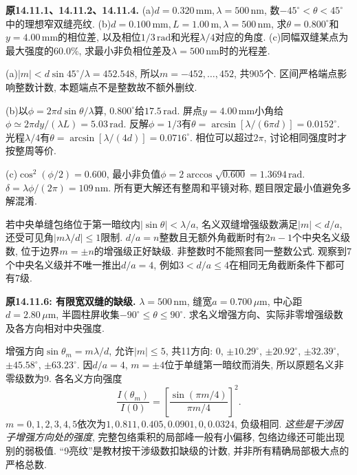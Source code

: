 \label{tb:interference-examples}
\begin{example}
\textbf{原14.11.1、14.11.2、14.11.4.} (a)$d=0.320\,\mathrm{mm},\lambda=500\,\mathrm{nm}$, 数$-45^\circ<\theta<45^\circ$中的理想窄双缝亮纹. (b)$d=0.100\,\mathrm{mm},L=1.00\,\mathrm m,\lambda=500\,\mathrm{nm}$, 求$\theta=0.800^\circ$和$y=4.00\,\mathrm{mm}$的相位差, 以及相位$1/3\,\mathrm{rad}$和光程$\lambda/4$对应的角度. (c)同幅双缝某点为最大强度的60.0\%, 求最小非负相位差及$\lambda=500\,\mathrm{nm}$时的光程差.
\end{example}
\begin{solution}
(a)$|m|<d\sin45^\circ/\lambda=452.548$, 所以$m=-452,\ldots,452$, 共905个. 区间严格端点影响整数计数, 本题端点不是整数故不额外删纹.

(b)以$\phi=2\pi d\sin\theta/\lambda$算, $0.800^\circ$给$17.5\,\mathrm{rad}$. 屏点$y=4.00\,\mathrm{mm}$小角给$\phi\simeq2\pi dy/(\lambda L)=5.03\,\mathrm{rad}$. 反解$\phi=1/3$有$\theta=\arcsin[\lambda/(6\pi d)]=0.0152^\circ$. 光程$\lambda/4$有$\theta=\arcsin[\lambda/(4d)]=0.0716^\circ$. 相位可以超过$2\pi$, 讨论相同强度时才按整周等价.

(c)$\cos^2(\phi/2)=0.600$, 最小非负值$\phi=2\arccos\sqrt{0.600}=1.3694\,\mathrm{rad}$. $\delta=\lambda\phi/(2\pi)=109\,\mathrm{nm}$. 所有更大解还有整周和平镜对称, 题目限定最小值避免多解混淆.
\end{solution}

若中央单缝包络位于第一暗纹内$|\sin\theta|<\lambda/a$, 名义双缝增强级数满足$|m|<d/a$, 还受可见角$|m\lambda/d|\le1$限制. $d/a=n$整数且无额外角截断时有$2n-1$个中央名义级数, 位于边界$m=\pm n$的增强级正好缺级. 非整数时不能照套同一整数公式. 观察到7个中央名义级并不唯一推出$d/a=4$, 例如$3<d/a\le4$在相同无角截断条件下都可有7级.

\begin{example}
\textbf{原14.11.6: 有限宽双缝的缺级.} $\lambda=500\,\mathrm{nm}$, 缝宽$a=0.700\,\mu\mathrm m$, 中心距$d=2.80\,\mu\mathrm m$, 半圆柱屏收集$-90^\circ\le\theta\le90^\circ$. 求名义增强方向、实际非零增强级数及各方向相对中央强度.
\end{example}
\begin{solution}
增强方向$\sin\theta_m=m\lambda/d$, 允许$|m|\le5$, 共11方向: $0$, $\pm10.29^\circ$, $\pm20.92^\circ$, $\pm32.39^\circ$, $\pm45.58^\circ$, $\pm63.23^\circ$. 因$d/a=4$, $m=\pm4$位于单缝第一暗纹而消失, 所以原题名义非零级数为9. 各名义方向强度
\[\frac{I(\theta_m)}{I(0)}=\left[\frac{\sin(\pi m/4)}{\pi m/4}\right]^2.\]
$m=0,1,2,3,4,5$依次为$1,0.811,0.405,0.0901,0,0.0324$, 负级相同. \emph{这些是干涉因子增强方向处的强度}, 完整包络乘积的局部峰一般有小偏移, 包络边缘还可能出现别的弱极值. “9亮纹”是教材按干涉级数扣缺级的计数, 并非所有精确局部极大点的严格总数.
\end{solution}

